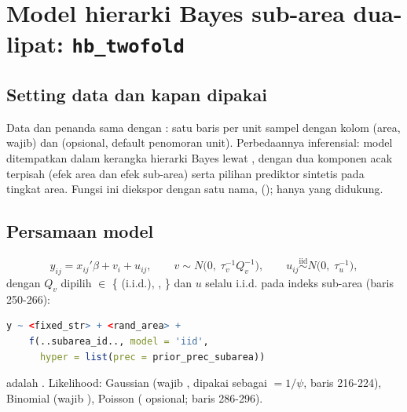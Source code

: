\section{Model hierarki Bayes sub-area dua-lipat: \texttt{hb\_twofold}}\label{sec:hbtwofold}

\subsection{Setting data dan kapan dipakai}\label{sec:hbtwofold-setting}

Data dan penanda sama dengan : satu baris per unit sampel
dengan kolom  (area, wajib) dan  (opsional,
default penomoran unit). Perbedaannya inferensial: model ditempatkan dalam
kerangka hierarki Bayes lewat , dengan dua komponen acak terpisah
(efek area dan efek sub-area) serta pilihan prediktor sintetis pada tingkat
area. Fungsi ini diekspor dengan satu nama, 
(); hanya  yang didukung.

\subsection{Persamaan model}\label{sec:hbtwofold-model}

\begin{equation}
  y_{ij}=x_{ij}'\beta+v_i+u_{ij},\qquad
  v\sim N\bigl(0,\;\tau_v^{-1}Q_v^{-1}\bigr),\qquad
  u_{ij}\overset{\text{iid}}{\sim}N\bigl(0,\;\tau_u^{-1}\bigr),
  \label{eq:hbtwofold-model}
\end{equation}
dengan $Q_v$ dipilih  $\in$
\{ (i.i.d.), , \} dan $u$ selalu i.i.d.
pada indeks sub-area (baris 250-266):
\begin{lstlisting}[language=R]
y ~ <fixed_str> + <rand_area> +
    f(..subarea_id.., model = 'iid',
      hyper = list(prec = prior_prec_subarea))
\end{lstlisting}
 adalah .
Likelihood: Gaussian (wajib , dipakai sebagai
 $=1/\psi$, baris 216-224), Binomial (wajib ),
Poisson ( opsional; baris 286-296).

